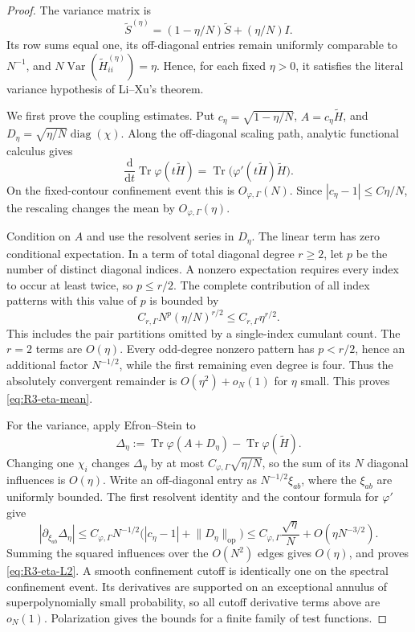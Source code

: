 \documentclass[10pt,a4paper]{amsart}
\newcommand{\Var}{\operatorname{Var}}
\newcommand{\Tr}{\operatorname{Tr}}
\newcommand{\diag}{\operatorname{diag}}
\newcommand{\dd}{\mathrm d}
\newcommand{\op}{\mathrm{op}}
\newcommand{\norm}[1]{\lVert #1\rVert}
\begin{document}
\begin{proof}
The variance matrix is
\begin{equation}\label{eq:R3-eta-profile}
 \widetilde S^{(\eta)}
 =(1-\eta/N)\widetilde S+(\eta/N)I.
\end{equation}
Its row sums equal one, its off-diagonal entries remain uniformly comparable
to \(N^{-1}\), and
\(N\Var(\widetilde H^{(\eta)}_{ii})=\eta\).  Hence, for each fixed
\(\eta>0\), it satisfies the literal variance hypothesis of Li--Xu's theorem.

We first prove the coupling estimates.  Put
\(c_\eta=\sqrt{1-\eta/N}\), \(A=c_\eta\widetilde H\), and
\(D_\eta=\sqrt{\eta/N}\diag(\chi)\).  Along the off-diagonal scaling path,
analytic functional calculus gives
\[
 \frac{\dd}{\dd t}\Tr\varphi(t\widetilde H)
 =\Tr\bigl(\varphi'(t\widetilde H)\widetilde H\bigr).
\]
On the fixed-contour confinement event this is \(O_{\varphi,\Gamma}(N)\).
Since \(|c_\eta-1|\le C\eta/N\), the rescaling changes the mean by
\(O_{\varphi,\Gamma}(\eta)\).

Condition on \(A\) and use the resolvent series in \(D_\eta\).  The linear
term has zero conditional expectation.  In a term of total diagonal degree
\(r\ge2\), let \(p\) be the number of distinct diagonal indices.  A nonzero
expectation requires every index to occur at least twice, so \(p\le r/2\).
The complete contribution of all index patterns with this value of \(p\) is
bounded by
\[
 C_{r,\Gamma}N^p(\eta/N)^{r/2}
 \le C_{r,\Gamma}\eta^{r/2}.
\]
This includes the pair partitions omitted by a single-index cumulant count.
The \(r=2\) terms are \(O(\eta)\).  Every odd-degree nonzero pattern has
\(p<r/2\), hence an additional factor \(N^{-1/2}\), while the first
remaining even degree is four.  Thus the absolutely convergent remainder is
\(O(\eta^2)+o_N(1)\) for \(\eta\) small.  This proves
\eqref{eq:R3-eta-mean}.

For the variance, apply Efron--Stein to
\[
 \Delta_\eta
 :=\Tr\varphi(A+D_\eta)-\Tr\varphi(\widetilde H).
\]
Changing one \(\chi_i\) changes \(\Delta_\eta\) by at most
\(C_{\varphi,\Gamma}\sqrt{\eta/N}\), so the sum of its \(N\) diagonal
influences is \(O(\eta)\).  Write an off-diagonal entry as
\(N^{-1/2}\xi_{ab}\), where the \(\xi_{ab}\) are uniformly bounded.  The
first resolvent identity and the contour formula for \(\varphi'\) give
\[
 |\partial_{\xi_{ab}}\Delta_\eta|
 \le C_{\varphi,\Gamma}N^{-1/2}
 \bigl(|c_\eta-1|+\norm{D_\eta}_{\op}\bigr)
 \le C_{\varphi,\Gamma}\frac{\sqrt\eta}{N}
    +O(\eta N^{-3/2}).
\]
Summing the squared influences over the \(O(N^2)\) edges gives \(O(\eta)\),
and proves \eqref{eq:R3-eta-L2}.  A smooth confinement cutoff is identically
one on the spectral confinement event.  Its derivatives are supported on an
exceptional annulus of superpolynomially small probability, so all cutoff
derivative terms above are \(o_N(1)\).  Polarization gives the bounds for a
finite family of test functions.


\end{proof}
\end{document}
